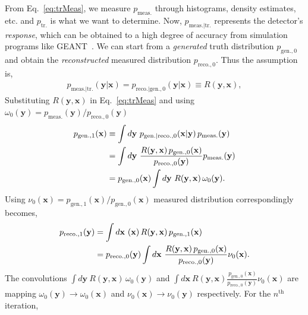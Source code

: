 From Eq.~\ref{eq:trMeas}, we measure \(p_\mathrm{meas.}\) through histograms, density estimates, etc. and \(p_\mathrm{tr.}\) is what we want to determine. Now, \(p_\mathrm{meas.|tr.}\) represents the detector's \emph{response}, which can be obtained to a high degree of accuracy from simulation programs like GEANT~\cite{MISC-15}. We can start from a \emph{generated} truth distribution  \(p_\mathrm{gen., 0}\) and obtain the \emph{reconstructed} measured distribution  \(p_\mathrm{reco., 0}\). Thus the assumption is, 
\begin{align}
	\label{eq:responseTransfer}
	p_\mathrm{meas.|tr.}(\mathbf{y} |  \mathbf{x}) = p_\mathrm{reco.|gen., 0}(\mathbf{y} |  \mathbf{x}) \equiv R(\mathbf{y}, \mathbf{x}) ,
\end{align}
Substituting \(R(\mathbf{y}, \mathbf{x})\) in Eq.~\ref{eq:trMeas} and using \(\omega_0(\mathbf{y}) = p_\mathrm{meas.}(\mathbf{y})/p_\mathrm{reco., 0}(\mathbf{y})\)
\begin{align}
	\label{eq:unfoldEstimator}
	p_\mathrm{gen., 1}(\mathbf{x}) &\equiv \int d\mathbf{y}~p_\mathrm{gen.|reco., 0}(\mathbf{x} |  \mathbf{y})\,p_\mathrm{meas.}(\mathbf{y}) \notag\\
	&=\int d\mathbf{y}~\frac{R(\mathbf{y}, \mathbf{x})\,p_\mathrm{gen., 0}(\mathbf{x})}{p_\mathrm{reco., 0}(\mathbf{y})} p_\mathrm{meas.}(\mathbf{y})\notag\\
	&= p_\mathrm{gen., 0}(\mathbf{x})\int d\mathbf{y}~R(\mathbf{y}, \mathbf{x})\,\omega_0(\mathbf{y}).
\end{align}
Using \(\nu_0(\mathbf{x}) = p_\mathrm{gen., 1}(\mathbf{x})/p_\mathrm{gen., 0}(\mathbf{x})\) measured distribution correspondingly becomes,
\begin{align}
	\label{eq:step2Joint}
	p_\mathrm{reco., 1}(\mathbf{y}) &= \int d\mathbf{x}~(\mathbf{x})\,R(\mathbf{y}, \mathbf{x})\,p_\mathrm{gen., 1}(\mathbf{x})\notag\\
	&= p_\mathrm{reco., 0}(\mathbf{y}) \int d\mathbf{x}~\frac{R(\mathbf{y}, \mathbf{x})\,p_\mathrm{gen., 0}(\mathbf{x})}{p_\mathrm{reco., 0}(\mathbf{y})}\nu_0(\mathbf{x}). 
\end{align}
The convolutions \(\int d\mathbf{y}~R(\mathbf{y}, \mathbf{x})\,\omega_0(\mathbf{y})\) and \(\int d\mathbf{x}~R(\mathbf{y}, \mathbf{x})\frac{\,p_\mathrm{gen., 0}(\mathbf{x})}{p_\mathrm{reco., 0}(\mathbf{y})}\nu_0(\mathbf{x})\) are mapping \(\omega_0(\mathbf{y})\to\omega_0(\mathbf{x})\) and \(\nu_0(\mathbf{x})\to\nu_0(\mathbf{y})\) respectively. 
%
For the \(n^\text{th}\) iteration, 
%
